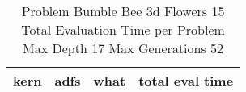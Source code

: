 \begin{table}[H]
\caption{Problem  Bumble Bee 3d  Flowers 15\\Total Evaluation Time per Problem \\ Max Depth 17 Max Generations 52\\}
\begin{center}
\scalebox{1.0} %
{
\begin{tabular}{lllr}
\hline
kern & adfs & what & total eval time \\
\hline


\end{tabular}
}
\end{center}
\end{table}

